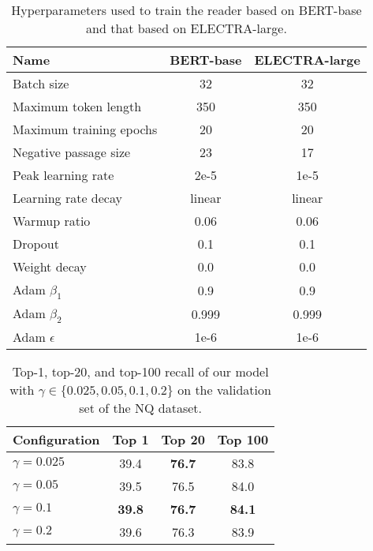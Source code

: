 \documentclass[11pt,a4paper]{article}
\begin{document}
\begin{table}[t]
  \centering
  \small{
  \setlength{\tabcolsep}{2pt}
    \begin{tabular}{l|cc}
      \toprule
      \textbf{Name}                    & \textbf{BERT-base} & \textbf{ELECTRA-large} \\
      \midrule
      Batch size            & 32     & 32  \\
      Maximum token length  & 350    & 350  \\
      Maximum training epochs & 20     & 20 \\
      Negative passage size & 23     & 17  \\
      Peak learning rate    & 2e-5   & 1e-5  \\
      Learning rate decay   & linear & linear\\
      Warmup ratio          & 0.06   & 0.06  \\
      Dropout               & 0.1    & 0.1   \\
      Weight decay          & 0.0    & 0.0   \\
      Adam $\beta_1$        & 0.9    & 0.9   \\
      Adam $\beta_2$        & 0.999  & 0.999 \\
      Adam $\epsilon$       & 1e-6   & 1e-6 \\
      \bottomrule
    \end{tabular}
  }
  \caption{Hyperparameters used to train the reader based on BERT-base and that based on ELECTRA-large.}
  \label{tb:reader-hyper-params}
\end{table}

\begin{table}[t]
  \centering
  \small{
    \begin{tabular}{l|ccc}
      \toprule
      \textbf{Configuration} & \textbf{Top 1} & \textbf{Top 20} & \textbf{Top 100} \\
      \midrule
      $\gamma=0.025$         & 39.4 & \textbf{76.7} & 83.8 \\
      $\gamma=0.05$          & 39.5 & 76.5 & 84.0 \\
      $\gamma=0.1$           & \textbf{39.8} & \textbf{76.7} & \textbf{84.1} \\
      $\gamma=0.2$           & 39.6 & 76.3 & 83.9 \\
      \bottomrule
    \end{tabular}
    \caption{Top-1, top-20, and top-100 recall of our model with $\gamma \in \{0.025, 0.05, 0.1, 0.2\}$ on the validation set of the NQ dataset.}
    \label{tb:experiments-gamma}
  }
\end{table}
\end{document}
